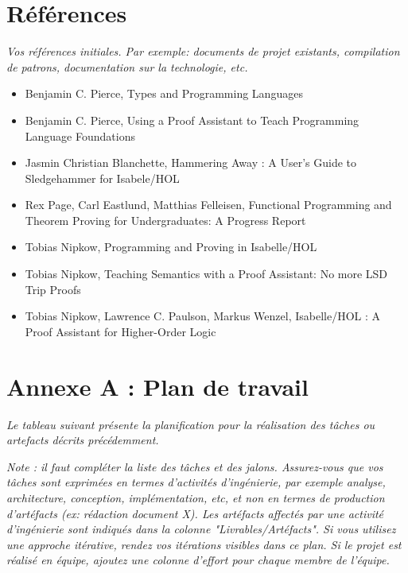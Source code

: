 \documentclass[a4paper, oneside, 12pt, titlepage, draft]{article}
\begin{document}
\section{Références}

\emph{Vos références initiales. Par exemple: documents de projet existants, compilation de patrons,
documentation sur la technologie, etc.}

\begin{itemize}
  \item Benjamin C. Pierce, Types and Programming Languages
  \item Benjamin C. Pierce, Using a Proof Assistant to Teach Programming Language Foundations
  \item Jasmin Christian Blanchette, Hammering Away : A User's Guide to Sledgehammer for Isabele/HOL
  \item Rex Page, Carl Eastlund, Matthias Felleisen, Functional Programming and Theorem Proving for
    Undergraduates: A Progress Report
  \item Tobias Nipkow, Programming and Proving in Isabelle/HOL
  \item Tobias Nipkow, Teaching Semantics with a Proof Assistant: No more LSD Trip Proofs
  \item Tobias Nipkow, Lawrence C. Paulson, Markus Wenzel, Isabelle/HOL : A Proof Assistant for
    Higher-Order Logic
\end{itemize}

\section{Annexe A : Plan de travail}

\emph{Le tableau suivant présente la planification pour la réalisation des tâches ou artefacts décrits
précédemment.}

\emph{Note : il faut compléter la liste des tâches et des jalons. Assurez-vous que vos tâches sont
exprimées en termes d'activités d'ingénierie, par exemple analyse, architecture, conception,
implémentation, etc, et non en termes de production d'artéfacts (ex: rédaction document X). Les
artéfacts affectés par une activité d'ingénierie sont indiqués dans la colonne
"Livrables/Artéfacts". Si vous utilisez une approche itérative, rendez vos itérations visibles
dans ce plan. Si le projet est réalisé en équipe, ajoutez une colonne d'effort pour chaque membre
de l'équipe.}
\end{document}
